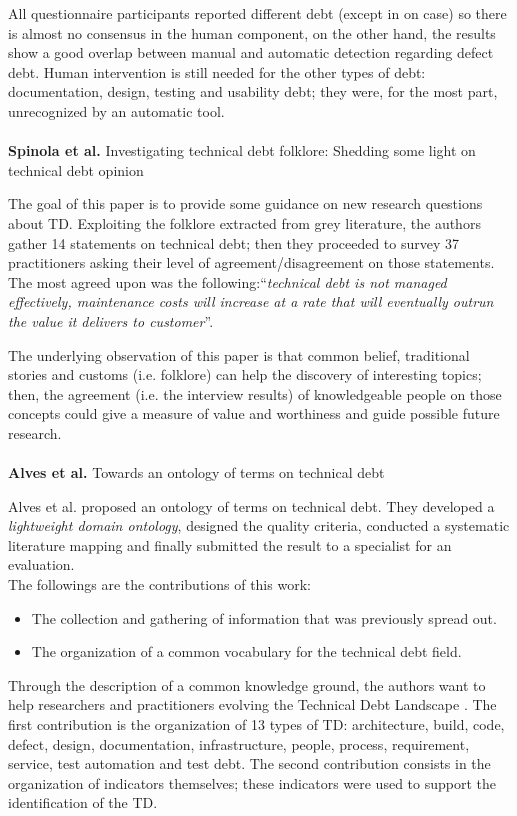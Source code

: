 All questionnaire participants reported different debt (except in on case) so there is almost no consensus in the human component, on the other hand, the results show a good overlap between manual and automatic detection regarding defect debt. Human intervention is still needed for the other types of debt: documentation, design, testing and usability debt; they were, for the most part, unrecognized by an automatic tool.
\\
\\
\textbf{Spinola et al.} \cite{spinola2013investigating} Investigating technical debt folklore: Shedding some light on technical debt opinion

The goal of this paper is to provide some guidance on new research questions about TD. Exploiting the folklore extracted from grey literature, the authors gather 14 statements on technical debt; then they proceeded to survey 37 practitioners asking their level of agreement/disagreement on those statements. The most agreed upon was the following:``\emph{technical debt is not managed effectively, maintenance costs will increase at a rate that will eventually outrun the value it delivers to customer}''.

The underlying observation of this paper is that common belief, traditional stories and customs (i.e. folklore) can help the discovery of interesting topics; then, the agreement (i.e. the interview results) of knowledgeable people on those concepts could give a measure of value and worthiness and guide possible future research.
\\
\\
\textbf{Alves et al.} \cite{alves2014towards} Towards an ontology of terms on technical debt

Alves et al. proposed an ontology of terms on technical debt. They developed a \emph{lightweight domain ontology}, designed the quality criteria, conducted a systematic literature mapping and finally submitted the result to a specialist for an evaluation.
\\
The followings are the contributions of this work:
\begin{itemize}
    \item The collection and gathering of information that was previously spread out.
    \item The organization of a common vocabulary for the technical debt field. 
\end{itemize}
Through the description of a common knowledge ground, the authors want to help researchers and practitioners evolving the Technical Debt Landscape \cite{izurieta2012organizing}.
The first contribution is the organization of 13 types of TD: architecture, build, code, defect, design, documentation, infrastructure, people, process, requirement, service, test automation and test debt.
The second contribution consists in the organization of indicators themselves; these indicators were used to support the identification of the TD.
\\
\\
